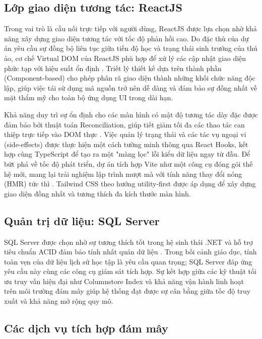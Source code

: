 \subsection{Lớp giao diện tương tác: ReactJS}

Trong vai trò là cầu nối trực tiếp với người dùng, ReactJS được lựa chọn nhờ khả năng xây dựng giao diện tương tác với tốc độ phản hồi cao. Do đặc thù của dự án yêu cầu sự đồng bộ liên tục giữa tiến độ học và trạng thái sinh trưởng của thú ảo, cơ chế Virtual DOM của ReactJS phù hợp để xử lý các cập nhật giao diện phức tạp với hiệu suất ổn định \cite{ReactDocs2024}. Triết lý thiết kế dựa trên thành phần (Component-based) cho phép phân rã giao diện thành những khối chức năng độc lập, giúp việc tái sử dụng mã nguồn trở nên dễ dàng và đảm bảo sự đồng nhất về mặt thẩm mỹ cho toàn bộ ứng dụng UI trong dài hạn.

Khả năng duy trì sự ổn định cho các màn hình có mật độ tương tác dày đặc được đảm bảo bởi thuật toán Reconciliation, giúp tiết giảm tối đa các thao tác can thiệp trực tiếp vào DOM thực \cite{ReactVirtualDOM2024}. Việc quản lý trạng thái và các tác vụ ngoại vi (side-effects) được thực hiện một cách tường minh thông qua React Hooks, kết hợp cùng TypeScript để tạo ra một "màng lọc" lỗi kiểu dữ liệu ngay từ đầu. Để bứt phá về tốc độ phát triển, dự án tích hợp Vite như một công cụ đóng gói thế hệ mới, mang lại trải nghiệm lập trình mượt mà với tính năng thay đổi nóng (HMR) tức thì \cite{ViteDocs2024}. Tailwind CSS theo hướng utility-first được áp dụng để xây dựng giao diện đồng nhất và tương thích đa kích thước màn hình.

\subsection{Quản trị dữ liệu: SQL Server}

SQL Server được chọn nhờ sự tương thích tốt trong hệ sinh thái .NET và hỗ trợ tiêu chuẩn ACID đảm bảo tính nhất quán dữ liệu \cite{SQLServerDocs2024}. Trong bối cảnh giáo dục, tính toàn vẹn của dữ liệu lịch sử học tập là yêu cầu quan trọng; SQL Server đáp ứng yêu cầu này cùng các công cụ giám sát tích hợp. Sự kết hợp giữa các kỹ thuật tối ưu truy vấn hiện đại như Columnstore Index và khả năng vận hành linh hoạt trên môi trường đám mây giúp hệ thống đạt được sự cân bằng giữa tốc độ truy xuất và khả năng mở rộng quy mô.

\subsection{Các dịch vụ tích hợp đám mây}


